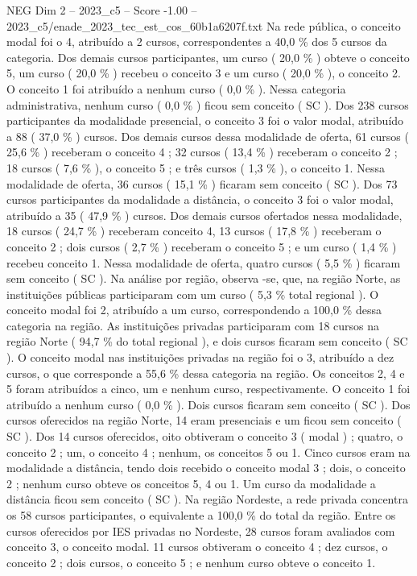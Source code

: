 \begin{textsample}{NEG Dim 2 – 2023\_c5 – Score -1.00 – 2023\_c5/enade\_2023\_tec\_est\_cos\_60b1a6207f.txt}
Na rede pública, o conceito modal foi o 4, atribuído a 2 cursos, correspondentes a 40,0 \% dos 5 cursos da categoria.
Dos demais cursos participantes, um curso ( 20,0 \% ) obteve o conceito 5, um curso ( 20,0 \% ) recebeu o conceito 3 e um curso ( 20,0 \% ), o conceito 2.
O conceito 1 foi atribuído a nenhum curso ( 0,0 \% ).
Nessa categoria administrativa, nenhum curso ( 0,0 \% ) ficou sem conceito ( SC ).
Dos 238 cursos participantes da modalidade presencial, o conceito 3 foi o valor modal, atribuído a 88 ( 37,0 \% ) cursos.
Dos demais cursos dessa modalidade de oferta, 61 cursos ( 25,6 \% ) receberam o conceito 4 ; 32 cursos ( 13,4 \% ) receberam o conceito 2 ; 18 cursos ( 7,6 \% ), o conceito 5 ; e três cursos ( 1,3 \% ), o conceito 1.
Nessa modalidade de oferta, 36 cursos ( 15,1 \% ) ficaram sem conceito ( SC ).
Dos 73 cursos participantes da modalidade a distância, o conceito 3 foi o valor modal, atribuído a 35 ( 47,9 \% ) cursos.
Dos demais cursos ofertados nessa modalidade, 18 cursos ( 24,7 \% ) receberam conceito 4, 13 cursos ( 17,8 \% ) receberam o conceito 2 ; dois cursos ( 2,7 \% ) receberam o conceito 5 ; e um curso ( 1,4 \% ) recebeu conceito 1.
Nessa modalidade de oferta, quatro cursos ( 5,5 \% ) ficaram sem conceito ( SC ).
Na análise por região, observa -se, que, na região Norte, as instituições públicas participaram com um curso ( 5,3 \% total regional ).
O conceito modal foi 2, atribuído a um curso, correspondendo a 100,0 \% dessa categoria na região.
As instituições privadas participaram com 18 cursos na região Norte ( 94,7 \% do total regional ), e dois cursos ficaram sem conceito ( SC ).
O conceito modal nas instituições privadas na região foi o 3, atribuído a dez cursos, o que corresponde a 55,6 \% dessa categoria na região.
Os conceitos 2, 4 e 5 foram atribuídos a cinco, um e nenhum curso, respectivamente.
O conceito 1 foi atribuído a nenhum curso ( 0,0 \% ).
Dois cursos ficaram sem conceito ( SC ).
Dos cursos oferecidos na região Norte, 14 eram presenciais e um ficou sem conceito ( SC ).
Dos 14 cursos oferecidos, oito obtiveram o conceito 3 ( modal ) ; quatro, o conceito 2 ; um, o conceito 4 ; nenhum, os conceitos 5 ou 1.
Cinco cursos eram na modalidade a distância, tendo dois recebido o conceito modal 3 ; dois, o conceito 2 ; nenhum curso obteve os conceitos 5, 4 ou 1.
Um curso da modalidade a distância ficou sem conceito ( SC ).
Na região Nordeste, a rede privada concentra os 58 cursos participantes, o equivalente a 100,0 \% do total da região.
Entre os cursos oferecidos por IES privadas no Nordeste, 28 cursos foram avaliados com conceito 3, o conceito modal. 11 cursos obtiveram o conceito 4 ; dez cursos, o conceito 2 ; dois cursos, o conceito 5 ; e nenhum curso obteve o conceito 1.

\end{textsample}
